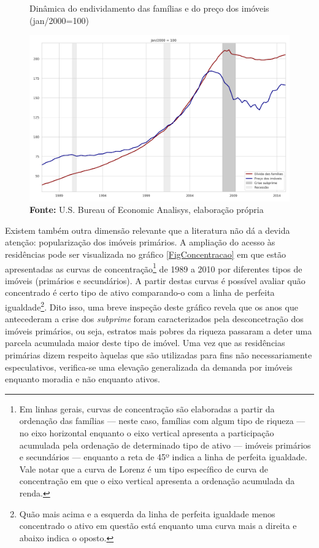 \begin{figure}[H]
	\centering
	\caption{Dinâmica do endividamento das famílias e do preço dos imóveis (jan/2000=100)}
	\label{FigDividaPreco}
	\includegraphics[width=\textwidth]{../../Dados/Fatos_Estilizados/figs/Divida_PrecoImoveis.png}
	\caption*{\textbf{Fonte:} U.S. Bureau of Economic Analisys, elaboração própria}
\end{figure}

Existem também outra dimensão relevante que a literatura não dá a devida atenção: popularização dos imóveis primários.
A ampliação do acesso às residências pode ser visualizada no gráfico \ref{FigConcentracao} em que estão apresentadas as curvas de concentração\footnote{Em linhas gerais, curvas de concentração são elaboradas a partir da ordenação das famílias --- neste caso, famílias com algum tipo de riqueza --- no eixo horizontal enquanto o eixo vertical apresenta a participação acumulada  pela ordenação de determinado tipo de ativo --- imóveis primários e secundários --- enquanto a reta de 45º indica a linha de perfeita igualdade. Vale notar que a curva de Lorenz é um tipo específico de curva de concentração em que o eixo vertical apresenta a ordenação acumulada da renda.} de 1989 a 2010 por diferentes tipos de imóveis (primários e secundários).
A partir destas curvas é possível avaliar quão concentrado é certo tipo de ativo comparando-o com a linha de perfeita igualdade\footnote{Quão mais acima e a esquerda da linha de perfeita igualdade menos concentrado o ativo em questão está enquanto uma curva mais a direita e abaixo indica o oposto.}.
Dito isso, uma breve inspeção deste gráfico revela que os anos que antecederam a crise dos \textit{subprime} foram caracterizados pela desconcetração dos imóveis primários, ou seja, estratos mais pobres da riqueza passaram a deter uma parcela acumulada maior deste tipo de imóvel.
Uma vez que as residências primárias dizem respeito àquelas que são utilizadas para fins não necessariamente especulativos, verifica-se uma elevação generalizada da demanda por imóveis enquanto moradia e não enquanto ativos.

